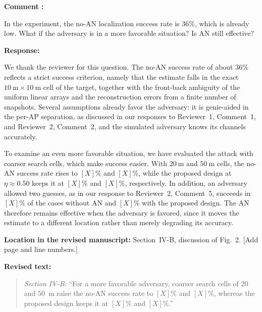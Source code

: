 \documentclass[a4paper,12pt]{article}
\newcounter{reviewcomment}
\newenvironment{reviewcomment}{%
  \stepcounter{reviewcomment}%
  \begin{shaded}
  \textbf{Comment \thereviewcomment:}\par
}{\end{shaded}}
\newenvironment{response}{\par\textbf{Response:}\par}{\par}
\newcommand{\revisionlocation}[1]{\par\textbf{Location in the revised manuscript:} #1\par}
\newenvironment{revisedtext}{%
  \par\textbf{Revised text:}\begin{quote}\color{red}
}{\end{quote}}
\begin{document}
\begin{reviewcomment}
In the experiment, the no-AN localization success rate is 36\%, which is
already low. What if the adversary is in a more favorable situation? Is AN
still effective?
\end{reviewcomment}
\begin{response}
We thank the reviewer for this question. The no-AN success rate of about
$36\%$ reflects a strict success criterion, namely that the estimate falls in
the exact $10~\mathrm{m}\times10~\mathrm{m}$ cell of the target, together
with the front-back ambiguity of the uniform linear arrays and the
reconstruction errors from a finite number of snapshots. Several assumptions
already favor the adversary: it is genie-aided in the per-AP separation, as
discussed in our responses to Reviewer~1, Comment~1, and Reviewer~2,
Comment~2, and the simulated adversary knows its channels accurately.

To examine an even more favorable situation, we have evaluated the attack
with coarser search cells, which make success easier. With
$20~\mathrm{m}$ and $50~\mathrm{m}$ cells, the no-AN success rate rises to
$[X]\%$ and $[X]\%$, while the proposed design at $\eta\approx0.50$ keeps it
at $[X]\%$ and $[X]\%$, respectively. In addition, an adversary allowed two
guesses, as in our response to Reviewer~2, Comment~5, succeeds in $[X]\%$ of
the cases without AN and $[X]\%$ with the proposed design. The AN therefore
remains effective when the adversary is favored, since it moves the
estimate to a different location rather than merely degrading its accuracy.
\end{response}
\revisionlocation{Section~IV-B, discussion of Fig.~2. [Add page and line
numbers.]}
\begin{revisedtext}
\textit{Section IV-B:} ``For a more favorable adversary, coarser search
cells of $20$ and $50$~m raise the no-AN success rate to $[X]\%$ and
$[X]\%$, whereas the proposed design keeps it at $[X]\%$ and $[X]\%$.''
\end{revisedtext}
\end{document}
